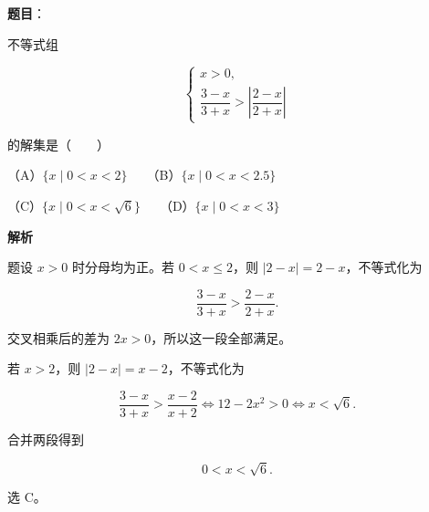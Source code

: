 \begin{answer}

\textbf{题目}：

不等式组

\nopagebreak[4]
\[
\begin{cases}
x>0,\\[2pt]
\dfrac{3-x}{3+x}>\left|\dfrac{2-x}{2+x}\right|
\end{cases}
\]

的解集是\mbox{（　　）}

（A）$\{x\mid0<x<2\}$　　（B）$\{x\mid0<x<2.5\}$

（C）$\{x\mid0<x<\sqrt6\}$　　（D）$\{x\mid0<x<3\}$

\textbf{解析}

题设 $x>0$ 时分母均为正。若 $0<x\leqslant2$，则 $|2-x|=2-x$，不等式化为

\nopagebreak[4]
\[
\frac{3-x}{3+x}>\frac{2-x}{2+x}.
\]

交叉相乘后的差为 $2x>0$，所以这一段全部满足。

若 $x>2$，则 $|2-x|=x-2$，不等式化为

\nopagebreak[4]
\[
\frac{3-x}{3+x}>\frac{x-2}{x+2}
\iff 12-2x^2>0
\iff x<\sqrt6.
\]

合并两段得到

\nopagebreak[4]
\[
0<x<\sqrt6.
\]

选 C。


\end{answer}
